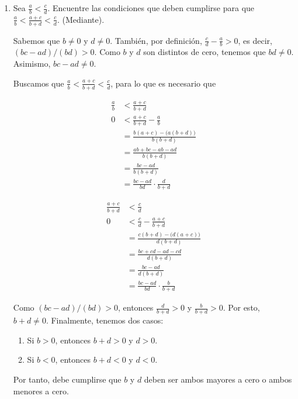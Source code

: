 \begin{enumerate}[label=\alph*)]
 \item Sea $\frac{a}{b}<\frac{c}{d}$. Encuentre las condiciones que deben cumplirse para que $\frac{a}{b}<\frac{a+c}{b+d}<\frac{c}{d}$. (Mediante).

 Sabemos que $b\neq 0$ y $d\neq 0$. También, por definición, $\frac{c}{d}-\frac{a}{b}>0$, es decir, $(bc-ad)/(bd)>0$. Como $b$ y $d$ son distintos de cero, tenemos que $bd\neq 0$. Asimismo, $bc-ad\neq 0$.

 Buscamos que $\frac{a}{b}<\frac{a+c}{b+d}<\frac{c}{d}$, para lo que es necesario que
 \begin{center}%
 \begin{minipage}[l]{.5\linewidth}
 \begin{align*}
  \frac{a}{b} &< \frac{a+c}{b+d}\\
  0 &< \frac{a+c}{b+d} - \frac{a}{b}\\
  &= \frac{b(a+c)-\bigl(a(b+d)\bigr)}{b(b+d)}\\
  &= \frac{ab+bc-ab-ad}{b(b+d)}\\
  &= \frac{bc-ad}{b(b+d)}\\
  &= \frac{bc-ad}{bd} \cdot \frac{d}{b+d}
 \end{align*}
 \end{minipage}%
 \begin{minipage}[r]{.5\linewidth}
 \begin{align*}
  \frac{a+c}{b+d} &< \frac{c}{d}\\
  0 &< \frac{c}{d} -\frac{a+c}{b+d}\\
  &= \frac{c(b+d)-\bigl(d(a+c)\bigr)}{d(b+d)}\\
  &= \frac{bc+cd-ad-cd}{d(b+d)}\\
  &= \frac{bc-ad}{d(b+d)}\\
  &= \frac{bc-ad}{bd} \cdot \frac{b}{b+d}
 \end{align*}
 \end{minipage}
 \end{center}
 Como $(bc-ad)/(bd)>0$, entonces $\frac{d}{b+d}>0$ y $\frac{b}{b+d}>0$. Por esto, $b+d\neq 0$. Finalmente, tenemos dos casos: \begin{enumerate}[label=\roman*)]
  \item Si $b>0$, entonces $b+d>0$ y $d>0$.
  \item Si $b<0$, entonces $b+d<0$ y $d<0$.
 \end{enumerate}

 Por tanto, debe cumplirse que $b$ y $d$ deben ser ambos mayores a cero o ambos menores a cero.
 
\end{enumerate}

